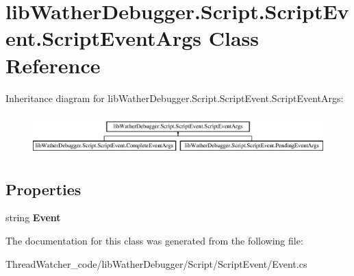 \hypertarget{classlib_wather_debugger_1_1_script_1_1_script_event_1_1_script_event_args}{\section{lib\+Wather\+Debugger.\+Script.\+Script\+Event.\+Script\+Event\+Args Class Reference}
\label{classlib_wather_debugger_1_1_script_1_1_script_event_1_1_script_event_args}
}
Inheritance diagram for lib\+Wather\+Debugger.\+Script.\+Script\+Event.\+Script\+Event\+Args\+:\begin{figure}[H]
\begin{center}
\leavevmode
\includegraphics[height=1.600000cm]{classlib_wather_debugger_1_1_script_1_1_script_event_1_1_script_event_args}
\end{center}
\end{figure}
\subsection*{Properties}
\begin{DoxyCompactItemize}
\item 
\hypertarget{classlib_wather_debugger_1_1_script_1_1_script_event_1_1_script_event_args_ada53a5a8e5f4a28991560b78c1a58cf9}{string {\bfseries Event}}\label{classlib_wather_debugger_1_1_script_1_1_script_event_1_1_script_event_args_ada53a5a8e5f4a28991560b78c1a58cf9}

\end{DoxyCompactItemize}


The documentation for this class was generated from the following file\+:\begin{DoxyCompactItemize}
\item 
Thread\+Watcher\+\_\+code/lib\+Wather\+Debugger/\+Script/\+Script\+Event/Event.\+cs\end{DoxyCompactItemize}
